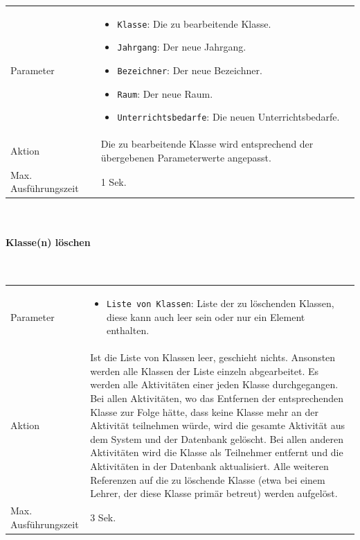 \documentclass[fontsize=12pt,paper=a4,twoside]{scrartcl}
\begin{document}
\begin{tabularx}{\textwidth}{p{4cm}X}
Parameter & \begin{itemize}[itemsep=0pt, leftmargin = 0.5cm]
			\item \texttt{Klasse}: Die zu bearbeitende Klasse.
			\item \texttt{Jahrgang}: Der neue Jahrgang.
			\item \texttt{Bezeichner}: Der neue Bezeichner.
			\item \texttt{Raum}: Der neue Raum.
			\item \texttt{Unterrichtsbedarfe}: Die neuen Unterrichtsbedarfe.
			\end{itemize}\\
Aktion & Die zu bearbeitende Klasse wird entsprechend der übergebenen Parameterwerte angepasst. \\
Max. Ausführungszeit & 1 Sek. 
\end{tabularx}\\


\paragraph{Klasse(n) löschen}\mbox{}\\

\begin{tabularx}{\textwidth}{p{4cm}X}
Parameter & \begin{itemize}[itemsep=0pt, leftmargin = 0.5cm]
			\item \texttt{Liste von Klassen}: Liste der zu löschenden Klassen, diese kann auch leer sein oder nur ein Element enthalten.
			\end{itemize}\\
Aktion & Ist die Liste von Klassen leer, geschieht nichts. Ansonsten werden alle Klassen der Liste einzeln abgearbeitet. Es werden alle Aktivitäten einer jeden Klasse durchgegangen. Bei allen Aktivitäten, wo das Entfernen der entsprechenden Klasse zur Folge hätte, dass keine Klasse mehr an der Aktivität teilnehmen würde, wird die gesamte Aktivität aus dem System und der Datenbank gelöscht. Bei allen anderen Aktivitäten wird die Klasse als Teilnehmer entfernt und die Aktivitäten in der Datenbank aktualisiert. Alle weiteren Referenzen  auf die zu löschende Klasse (etwa bei einem Lehrer, der diese Klasse primär betreut) werden aufgelöst. \\
Max. Ausführungszeit & 3 Sek. 
\end{tabularx}\\
\end{document}
